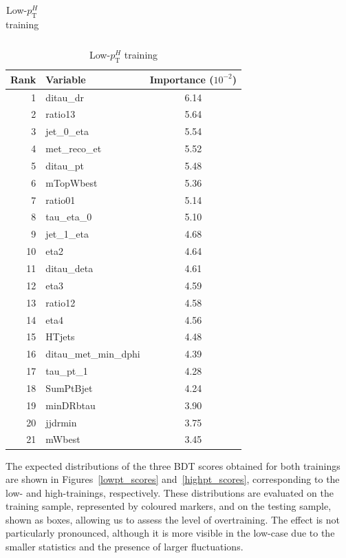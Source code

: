\begin{table}[h]
\begin{subtable}[t]{0.48\textwidth}
\begin{tabular}{r l c}
      \bottomrule
    \end{tabular}
    \caption{High-$p_{\mathrm{T}}^{H}$ training}
  \end{subtable}%
  \hfill
  \begin{subtable}[t]{0.48\textwidth}
    \centering
    \begin{tabular}{r l c}
      \toprule
      \textbf{Rank} & \textbf{Variable} & \textbf{Importance} \tiny{($10^{-2}$)} \\
      \midrule
       1 & ditau\_dr             & 6.14 \\
       2 & ratio13               & 5.64 \\
       3 & jet\_0\_eta           & 5.54 \\
       4 & met\_reco\_et         & 5.52 \\
       5 & ditau\_pt             & 5.48 \\
       6 & mTopWbest             & 5.36 \\
       7 & ratio01               & 5.14 \\
       8 & tau\_eta\_0           & 5.10 \\
       9 & jet\_1\_eta           & 4.68 \\
      10 & eta2                  & 4.64 \\
      11 & ditau\_deta           & 4.61 \\
      12 & eta3                  & 4.59 \\
      13 & ratio12               & 4.58 \\
      14 & eta4                  & 4.56 \\
      15 & HTjets                & 4.48 \\
      16 & ditau\_met\_min\_dphi & 4.39 \\
      17 & tau\_pt\_1            & 4.28 \\
      18 & SumPtBjet             & 4.24 \\
      19 & minDRbtau             & 3.90 \\
      20 & jjdrmin              & 3.75 \\
      21 & mWbest                & 3.45 \\
      \bottomrule
    \end{tabular}
    \caption{Low-$p_{\mathrm{T}}^{H}$ training}
  \end{subtable}
  \label{tab:bdt_importance_high_low}
\end{table}

The expected distributions of the three BDT scores obtained for both trainings are shown in Figures~\ref{lowpt_scores} and~\ref{highpt_scores}, corresponding to the low- and high-\pth trainings, respectively. These distributions are evaluated on the training sample, represented by coloured markers, and on the testing sample, shown as boxes, allowing us to assess the level of overtraining. The effect is not particularly pronounced, although it is more visible in the low-\pth case due to the smaller statistics and the presence of larger fluctuations.  


